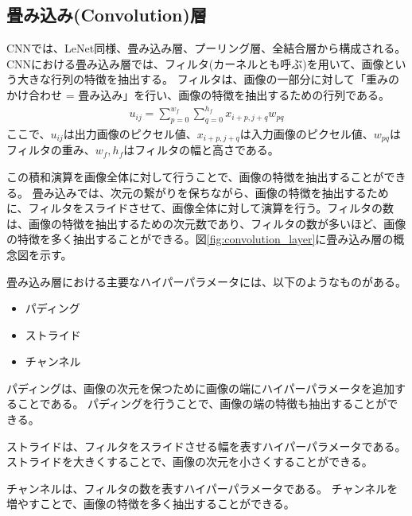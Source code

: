 \documentclass{ltjsarticle}
\begin{document}
\subsection{畳み込み(Convolution)層}
CNNでは、LeNet同様、畳み込み層、プーリング層、全結合層から構成される。
CNNにおける畳み込み層では、フィルタ(カーネルとも呼ぶ)を用いて、画像という大きな行列の特徴を抽出する。
フィルタは、画像の一部分に対して「重みのかけ合わせ = 畳み込み」を行い、画像の特徴を抽出するための行列である。
\begin{align}
  u_{ij} = \sum^{w_f}_{p=0} \sum^{h_f}_{q=0} x_{i+p, j+q}w_{pq}
\end{align}
ここで、$u_{ij}$は出力画像のピクセル値、$x_{i+p, j+q}$は入力画像のピクセル値、$w_{pq}$はフィルタの重み、$w_f, h_f$はフィルタの幅と高さである。
\par
この積和演算を画像全体に対して行うことで、画像の特徴を抽出することができる。
畳み込みでは、次元の繋がりを保ちながら、画像の特徴を抽出するために、フィルタをスライドさせて、画像全体に対して演算を行う。フィルタの数は、画像の特徴を抽出するための次元数であり、フィルタの数が多いほど、画像の特徴を多く抽出することができる。図\ref{fig:convolution_layer}に畳み込み層の概念図を示す。
\par
畳み込み層における主要なハイパーパラメータには、以下のようなものがある。
\begin{itemize}
  \item パディング
  \item ストライド
  \item チャンネル
\end{itemize}
\par
パディングは、画像の次元を保つために画像の端にハイパーパラメータを追加することである。
パディングを行うことで、画像の端の特徴も抽出することができる。
\par
ストライドは、フィルタをスライドさせる幅を表すハイパーパラメータである。
ストライドを大きくすることで、画像の次元を小さくすることができる。
\par
チャンネルは、フィルタの数を表すハイパーパラメータである。
チャンネルを増やすことで、画像の特徴を多く抽出することができる。
\end{document}
